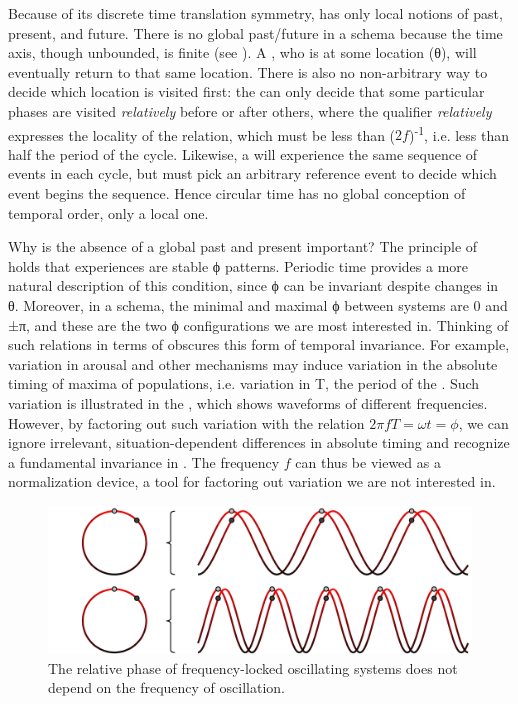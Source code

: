   Because of its discrete time translation symmetry,  has only local notions of past, present, and future. There is no global past/future in a  schema because the time axis, though unbounded, is finite (see {}). A , who is at some location (θ), will eventually return to that same location. There is also no non-arbitrary way to decide which location is visited first: the  can only decide that some particular phases are visited \textit{relatively} before or after others, where the qualifier \textit{relatively} expresses the locality of the relation, which must be less than ($2f$)\textsuperscript{{}-1}, i.e. less than half the period of the cycle. Likewise, a  will experience the same sequence of events in each cycle, but must pick an arbitrary reference event to decide which event begins the sequence. Hence circular time has no global conception of temporal order, only a local one. 

  Why is the absence of a global past and present important? The principle of  holds that  experiences are stable ϕ patterns. Periodic time provides a more natural description of this condition, since ϕ can be invariant despite changes in θ. Moreover, in a  schema, the minimal and maximal ϕ between systems are 0 and ±π, and these are the two ϕ configurations we are most interested in. Thinking of such relations in terms of  obscures this form of temporal invariance. For example, variation in arousal and other  mechanisms may induce variation in the absolute timing of  maxima of populations, i.e. variation in T, the period of the . Such variation is illustrated in the {}, which shows waveforms of different frequencies. However, by factoring out such variation with the relation $2πfT = \omega t = ϕ$, we can ignore irrelevant, situation-dependent differences in absolute timing and recognize a fundamental invariance in . The frequency $f$ can thus be viewed as a normalization device, a tool for factoring out variation we are not interested in.

  
\begin{figure}
\includegraphics[width=\textwidth]{figures/Tilsen-img48.png}
\caption{The relative phase of frequency-locked oscillating systems does not depend on the frequency of oscillation.}
\label{fig:3:20}
\end{figure}
 

